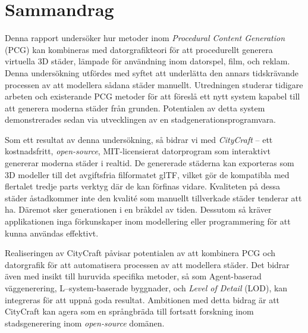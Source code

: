 \chapter*{Sammandrag}

Denna rapport undersöker hur metoder inom \textit{Procedural Content Generation} (PCG) kan kombineras med datorgrafikteori för att procedurellt generera virtuella 3D städer, lämpade för användning inom datorspel, film, och reklam.
Denna undersökning utfördes med syftet att underlätta den annars tidskrävande processen av att modellera sådana städer manuellt.
Utredningen studerar tidigare arbeten och existerande PCG metoder för att föreslå ett nytt system kapabel till att generera moderna städer från grunden.
Potentialen av detta system demonstrerades sedan via utvecklingen av en stadgenerationsprogramvara.

Som ett resultat av denna undersökning, så bidrar vi med \textit{CityCraft} -- ett kostnadsfritt, \textit{open-source}, MIT-licensierat datorprogram som interaktivt genererar moderna städer i realtid.
De genererade städerna kan exporteras som 3D modeller till det avgiftsfria filformatet glTF, vilket gör de kompatibla med flertalet tredje parts verktyg där de kan förfinas vidare.
Kvaliteten på dessa städer åstadkommer inte den kvalité som manuellt tillverkade städer tenderar att ha.
Däremot sker generationen i en bråkdel av tiden.
Dessutom så kräver applikationen inga förkunskaper inom modellering eller programmering för att kunna användas effektivt.

Realiseringen av CityCraft påvisar potentialen av att kombinera PCG och datorgrafik för att automatisera processen av att modellera städer.
Det bidrar även med insikt till huruvida specifika metoder, så som Agent-baserad väggenerering, L--system-baserade byggnader, och \textit{Level of Detail} (LOD), kan integreras för att uppnå goda resultat.
Ambitionen med detta bidrag är att CityCraft kan agera som en språngbräda till fortsatt forskning inom stadsgenerering inom \textit{open-source} domänen.